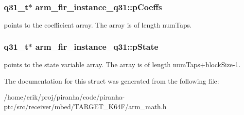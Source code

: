 \subsubsection[{\texorpdfstring{p\+Coeffs}{pCoeffs}}]{\setlength{\rightskip}{0pt plus 5cm}q31\+\_\+t$\ast$ arm\+\_\+fir\+\_\+instance\+\_\+q31\+::p\+Coeffs}\hypertarget{structarm__fir__instance__q31_afaae4c884bdf11a4ec2f3b9bb2bb51d0}{}\label{structarm__fir__instance__q31_afaae4c884bdf11a4ec2f3b9bb2bb51d0}
points to the coefficient array. The array is of length num\+Taps. 
\subsubsection[{\texorpdfstring{p\+State}{pState}}]{\setlength{\rightskip}{0pt plus 5cm}q31\+\_\+t$\ast$ arm\+\_\+fir\+\_\+instance\+\_\+q31\+::p\+State}\hypertarget{structarm__fir__instance__q31_a409f39c93b744784648bdc365541444d}{}\label{structarm__fir__instance__q31_a409f39c93b744784648bdc365541444d}
points to the state variable array. The array is of length num\+Taps+block\+Size-\/1. 

The documentation for this struct was generated from the following file\+:\begin{DoxyCompactItemize}
\item 
/home/erik/proj/piranha/code/piranha-\/ptc/src/receiver/mbed/\+T\+A\+R\+G\+E\+T\+\_\+\+K64\+F/arm\+\_\+math.\+h\end{DoxyCompactItemize}
